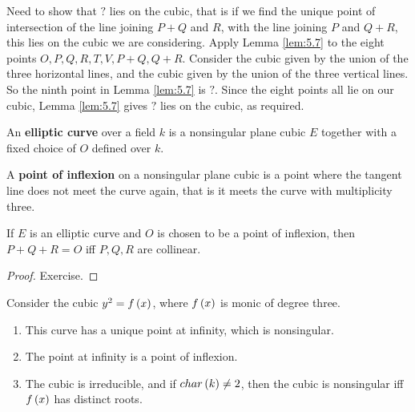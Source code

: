 Need to show that $ ? $ lies on the cubic, that is if we find the unique point of intersection of the line joining $ P + Q $ and $ R $, with the line joining $ P $ and $ Q + R $, this lies on the cubic we are considering. Apply Lemma \ref{lem:5.7} to the eight points $ O, P, Q, R, T, V, P + Q, Q + R $. Consider the cubic given by the union of the three horizontal lines, and the cubic given by the union of the three vertical lines. So the ninth point in Lemma \ref{lem:5.7} is $ ? $. Since the eight points all lie on our cubic, Lemma \ref{lem:5.7} gives $ ? $ lies on the cubic, as required.

\begin{definition}
An \textbf{elliptic curve} over a field $ k $ is a nonsingular plane cubic $ E $ together with a fixed choice of $ O $ defined over $ k $.
\end{definition}

\begin{definition}
A \textbf{point of inflexion} on a nonsingular plane cubic is a point where the tangent line does not meet the curve again, that is it meets the curve with multiplicity three.
\end{definition}

\begin{lemma}
\label{lem:5.10}
If $ E $ is an elliptic curve and $ O $ is chosen to be a point of inflexion, then $ P + Q + R = O $ iff $ P, Q, R $ are collinear.
\end{lemma}

\begin{proof}
Exercise.
\end{proof}

\pagebreak

\begin{lemma}
Consider the cubic $ y^2 = f\br{x} $, where $ f\br{x} $ is monic of degree three.
\begin{enumerate}
\item This curve has a unique point at infinity, which is nonsingular.
\item The point at infinity is a point of inflexion.
\item The cubic is irreducible, and if $ char\br{k} \ne 2 $, then the cubic is nonsingular iff $ f\br{x} $ has distinct roots.
\end{enumerate}
\end{lemma}

